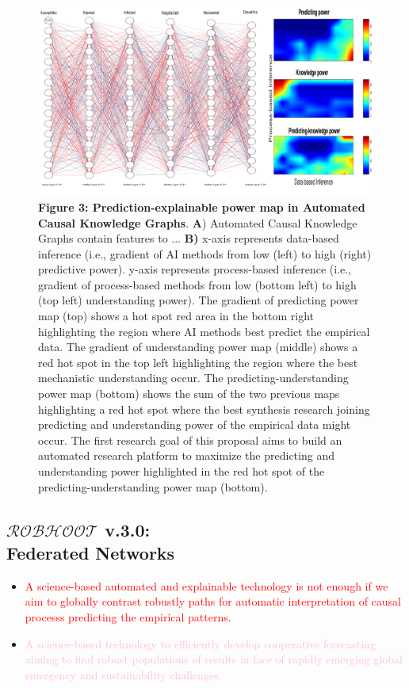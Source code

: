 \documentclass[12pt, a4paper]{article} %
\begin{document}
 \begin{figure}[h!]
   \includegraphics[width=1\textwidth]{Figures/Figure3integrated.pdf}
   {\small {\bf Figure 3: Prediction-explainable power map in
       Automated Causal Knowledge Graphs}. {\bf A}) Automated Causal
     Knowledge Graphs contain features to ... {\bf B)} x-axis
     represents data-based inference (i.e., gradient of AI methods
     from low (left) to high (right) predictive power). y-axis
     represents process-based inference (i.e., gradient of
     process-based methods from low (bottom left) to high (top left)
     understanding power). The gradient of predicting power map (top)
     shows a hot spot red area in the bottom right highlighting the
     region where AI methods best predict the empirical data. The
     gradient of understanding power map (middle) shows a red hot spot
     in the top left highlighting the region where the best
     mechanistic understanding occur. The predicting-understanding
     power map (bottom) shows the sum of the two previous maps
     highlighting a red hot spot where the best synthesis research
     joining predicting and understanding power of the empirical data
     might occur. The first research goal of this proposal aims to
     build an automated research platform to maximize the predicting
     and understanding power highlighted in the red hot spot of the
     predicting-understanding power map (bottom).}
\end{figure}
  
  
\subsection{{\bf $\mathcal{ROBHOOT}$ v.3.0}: \\ Federated Networks}

  \begin{itemize}
  \item \textcolor{red}{A science-based automated and explainable
      technology is not enough if we aim to globally contrast robustly
      paths for automatic interpretation of causal processs predicting
      the empirical patterns.}
  \item \textcolor{pink}{A science-based technology to efficiently
      develop cooperative forecasting aiming to find robust
      populations of results in face of rapidly emerging global
      emergency and sustainability challenges.}
  \end{itemize}
\end{document}
